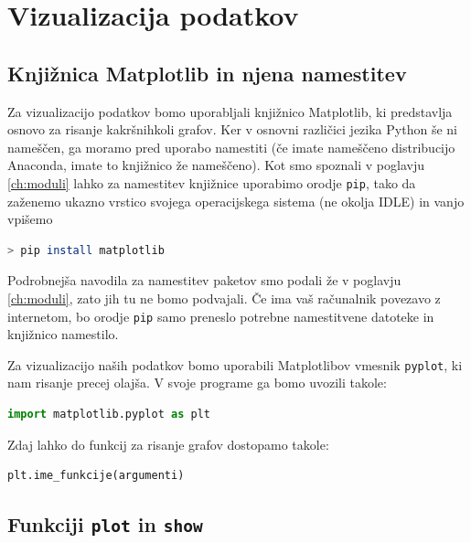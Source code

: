 \chapter{Vizualizacija podatkov}

\section{Knjižnica Matplotlib in njena namestitev}
Za vizualizacijo podatkov bomo uporabljali knjižnico Matplotlib, ki predstavlja osnovo za risanje kakršnihkoli grafov. Ker v osnovni različici jezika Python še ni nameščen, ga moramo pred uporabo namestiti (če imate nameščeno distribucijo Anaconda, imate to knjižnico že nameščeno). Kot smo spoznali v poglavju \ref{ch:moduli} lahko za namestitev knjižnice uporabimo orodje \texttt{pip}, tako da zaženemo ukazno vrstico svojega operacijskega sistema (ne okolja IDLE) in vanjo vpišemo
\begin{lstlisting}[language=bash]
> pip install matplotlib
\end{lstlisting}
Podrobnejša navodila za namestitev paketov smo podali že v poglavju \ref{ch:moduli}, zato jih tu ne bomo podvajali. Če ima vaš računalnik povezavo z internetom, bo orodje \texttt{pip} samo preneslo potrebne namestitvene datoteke in knjižnico namestilo.

Za vizualizacijo naših podatkov bomo uporabili Matplotlibov vmesnik  \texttt{pyplot}, ki nam risanje precej olajša. V svoje programe ga bomo uvozili takole:
\begin{lstlisting}[language=Python, showstringspaces=false]
import matplotlib.pyplot as plt
\end{lstlisting}
Zdaj lahko do funkcij za risanje grafov dostopamo takole:
\begin{lstlisting}[language=Python, showstringspaces=false]
plt.ime_funkcije(argumenti)
\end{lstlisting}

\section{Funkciji \texttt{plot} in \texttt{show}}

